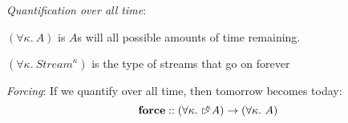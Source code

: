 \documentclass[xetex,serif,mathserif]{beamer}
\newcommand{\delay}[1]{\mathord{\rhd\kern-0.4em^{#1}}}
\newenvironment{slide}[1]{\begin{frame}\frametitle{#1}}{\end{frame}}
\newcommand{\kw}[1]{\textbf{#1}}
\newcommand{\tyname}[1]{\textit{#1}}
\begin{document}

\begin{slide}{}
  \textcolor{titlered}{\emph{Quantification over all time}}:\\

  \medskip

  \quad\quad $(\forall \kappa.~A)$ is $A$s will all possible amounts of time remaining.


  \pause
  \bigskip

  \quad\quad$(\forall \kappa.\ \tyname{Stream}^\kappa)$ is the type of streams that go on forever

  \pause
  \bigskip
  \bigskip

  \textcolor{titlered}{\emph{Forcing}}: If we quantify over all time,
  then tomorrow becomes today:
  \begin{displaymath}
    \kw{force} :: (\forall \kappa.\ \delay\kappa A) \to (\forall \kappa.\ A)
  \end{displaymath}

\end{slide}
\end{document}
